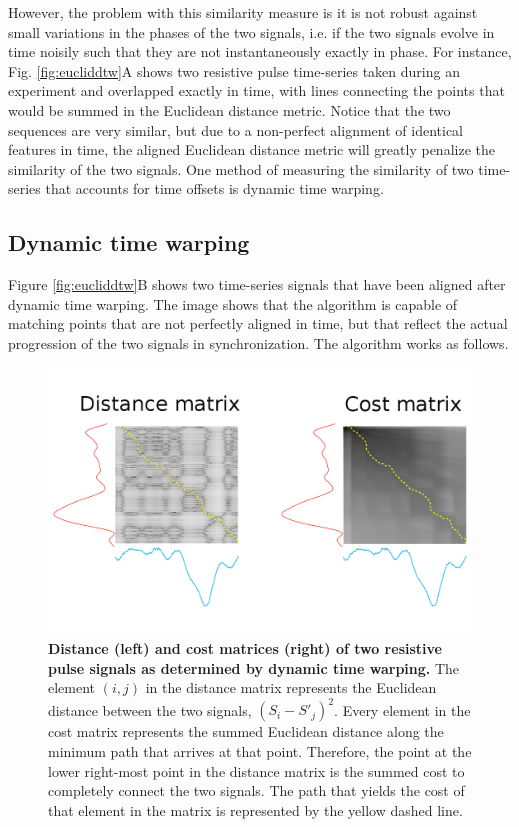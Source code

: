 		
		However, the problem with this similarity measure is it is not robust against small variations in the phases of the two signals, i.e. if the two signals evolve in time noisily such that they are not instantaneously exactly in phase. For instance, Fig. \ref{fig:eucliddtw}A shows two resistive pulse time-series taken during an experiment and overlapped exactly in time, with lines connecting the points that would be summed in the Euclidean distance metric\cite{Keogh2005}. Notice that the two sequences are very similar, but due to a non-perfect alignment of identical features in time, the aligned Euclidean distance metric will greatly penalize the similarity of the two signals. One method of measuring the similarity of two time-series that accounts for time offsets is dynamic time warping.
		
		\subsection{Dynamic time warping}
		
			Figure \ref{fig:eucliddtw}B shows two time-series signals that have been aligned after dynamic time warping. The image shows that the algorithm is capable of matching points that are not perfectly aligned in time, but that reflect the actual progression of the two signals in synchronization. The algorithm works as follows.
			
			\begin{figure}
				\includegraphics[width=\textwidth]{distancecost}
				\caption{\textbf{Distance (left) and cost matrices (right) of two resistive pulse signals as determined by dynamic time warping.} The element $\left(i,j\right)$ in the distance matrix represents the Euclidean distance between the two signals, $\left(S_{i}-S'_{j}\right)^{2}$. Every element in the cost matrix represents the summed Euclidean distance along the minimum path that arrives at that point. Therefore, the point at the lower right-most point in the distance matrix is the summed cost to completely connect the two signals. The path that yields the cost of that element in the matrix is represented by the yellow dashed line.}
				\label{fig:distancecost}
			\end{figure}

